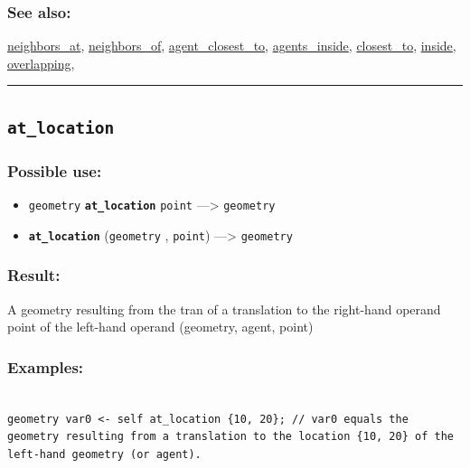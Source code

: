 \documentclass[]{book}
\providecommand{\tightlist}{%
  \setlength{\itemsep}{0pt}\setlength{\parskip}{0pt}}
\theoremstyle{definition}
\theoremstyle{definition}
\theoremstyle{definition}
\theoremstyle{remark}
\begin{document}
\subsubsection{See also:}\label{see-also-40}

\href{operators-n-to-r.html\#neighbors_at}{neighbors\_at},
\href{operators-n-to-r.html\#neighbors_of}{neighbors\_of},
\href{operators-a-to-a.html\#agent_closest_to}{agent\_closest\_to},
\href{operators-a-to-a.html\#agents_inside}{agents\_inside},
\href{operators-b-to-c.html\#closest_to}{closest\_to},
\href{operators-i-to-m.html\#inside}{inside},
\href{operators-n-to-r.html\#overlapping}{overlapping},

\begin{center}\rule{0.5\linewidth}{\linethickness}\end{center}

\subsection{\texorpdfstring{\texttt{at\_location}}{at\_location}}\label{at_location}

\subsubsection{Possible use:}\label{possible-use-58}

\begin{itemize}
\tightlist
\item
  \texttt{geometry} \textbf{\texttt{at\_location}} \texttt{point}
  ---\textgreater{} \texttt{geometry}
\item
  \textbf{\texttt{at\_location}} (\texttt{geometry} , \texttt{point})
  ---\textgreater{} \texttt{geometry}
\end{itemize}

\subsubsection{Result:}\label{result-57}

A geometry resulting from the tran of a translation to the right-hand
operand point of the left-hand operand (geometry, agent, point)

\subsubsection{Examples:}\label{examples-48}

\begin{verbatim}
 
geometry var0 <- self at_location {10, 20}; // var0 equals the geometry resulting from a translation to the location {10, 20} of the left-hand geometry (or agent).
\end{verbatim}
\end{document}
